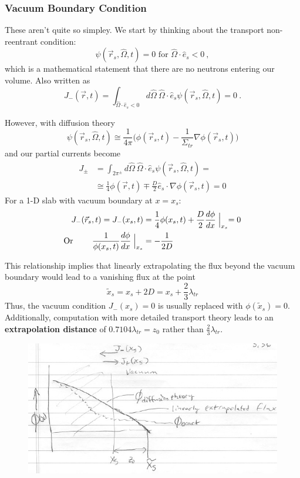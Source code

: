 \documentclass[12pt]{article}
\newcommand{\vOmega}{\ensuremath{\hat{\Omega}}}
\begin{document}
\subsubsection{Vacuum Boundary Condition}
These aren't quite so simpley. We start by thinking about the transport non-reentrant condition: 
\[\psi(\vec{r}_s, \vOmega, t) = 0 \text{ for } \vOmega \cdot \hat{e}_s < 0 \:,\]
%
which is a mathematical statement that there are no neutrons entering our volume. Also written as
\[J_{-}(\vec{r},t) = \int_{\vOmega \cdot \hat{e}_s < 0} d\vOmega \: \vOmega \cdot \hat{e}_s \psi(\vec{r}_s, \vOmega, t) = 0 \:.\]

However, with diffusion theory
\[\psi(\vec{r}_s, \vOmega, t) \cong \frac{1}{4\pi}\bigl(\phi(\vec{r}_s, t)  -\frac{1}{\Sigma_{tr}} \nabla \phi(\vec{r}_s, t)\bigr)\]
%
and our partial currents become
%
\begin{align}
J_{\pm} &= \int_{2\pi^{\pm}} d\vOmega \: \vOmega \cdot \hat{e}_s \psi(\vec{r}_s, \vOmega, t) =\\
&\cong \frac{1}{4} \phi(\vec{r}, t) \mp \frac{D}{2} \hat{e}_s \cdot \nabla \phi(\vec{r}_s, t) = 0
\end{align} 
%
For a 1-D slab with vacuum boundary at $x=x_s$:
%
\begin{align}
J_{-}(\vec{r}_s, t) = J_{-}(x_s, t) &= \frac{1}{4} \phi(x_s, t) + \frac{D}{2}\frac{d \phi}{dx}\Bigm\lvert_{x_s} = 0 \\
\text{Or } \qquad \frac{1}{\phi(x_s, t)}\frac{d \phi}{dx}\Bigm\lvert_{x_s} &= -\frac{1}{2D}
\end{align}

This relationship implies that linearly extrapolating the flux beyond the vacuum boundary would lead to a vanishing flux at the point
\[\tilde{x}_s = x_s + 2D = x_s + \frac{2}{3}\lambda_{tr}\]
%
Thus, the vacuum condition $J_{-}(x_s) = 0$ is usually replaced with $\phi(\tilde{x}_s)= 0$. Additionally, computation with more detailed transport theory leads to an \textbf{extrapolation distance} of $0.7104\lambda_{tr} = z_0$ rather than $\frac{2}{3}\lambda_{tr}$.
%
\begin{figure}[h!]
\begin{center}
\includegraphics[height=3 in]{DiffusionBC}
\end{center}
\end{figure}
\end{document}
